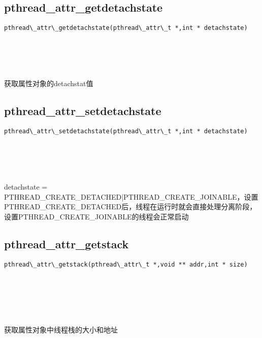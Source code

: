 \documentclass[10pt,a4paper]{article}
\begin{document}
\subsection{pthread\_attr\_getdetachstate}
\begin{spacing}{2.0}
\lstset{language=C,numbers=none}
\begin{lstlisting}
pthread\_attr\_getdetachstate(pthread\_attr\_t *,int * detachstate)
\end{lstlisting}
{\large\color[rgb]{0.2,0.4,0.6}{*:}} \\
{\large\color[rgb]{0.2,0.4,0.6}{detachstate:}}
\paragraph{ \ \ }获取属性对象的detachstat值
\end{spacing}

\subsection{pthread\_attr\_setdetachstate}
\begin{spacing}{2.0}
\lstset{language=C,numbers=none}
\begin{lstlisting}
pthread\_attr\_setdetachstate(pthread\_attr\_t *,int * detachstate)
\end{lstlisting}
{\large\color[rgb]{0.2,0.4,0.6}{*:}} \\
{\large\color[rgb]{0.2,0.4,0.6}{detachstate:}}
\paragraph{ \ \ }detachstate = PTHREAD\_CREATE\_DETACHED|PTHREAD\_CREATE\_JOINABLE，设置PTHREAD\_CREATE\_DETACHED后，线程在运行时就会直接处理分离阶段，设置PTHREAD\_CREATE\_JOINABLE的线程会正常启动
\end{spacing}

\subsection{pthread\_attr\_getstack}
\begin{spacing}{2.0}
\lstset{language=C,numbers=none}
\begin{lstlisting}
pthread\_attr\_getstack(pthread\_attr\_t *,void ** addr,int * size)
\end{lstlisting}
{\large\color[rgb]{0.2,0.4,0.6}{*:}} \\
{\large\color[rgb]{0.2,0.4,0.6}{addr:}} \\
{\large\color[rgb]{0.2,0.4,0.6}{size:}}
\paragraph{ \ \ }获取属性对象中线程栈的大小和地址
\end{spacing}
\end{document}
